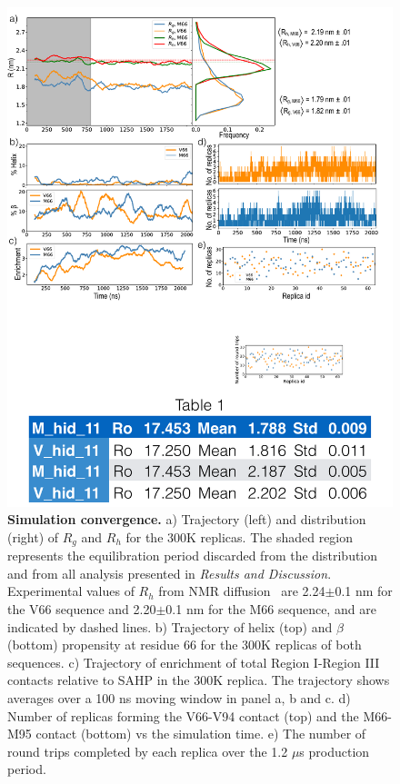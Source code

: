 \documentclass[10pt,letterpaper]{article}
\begin{document}
\begin{figure}[!ht]
\includegraphics[scale=0.5,width=\textwidth,trim={0 0cm 0 0cm},clip]{./figures/fig8.pdf}
\caption{{\bf Simulation convergence.} a) Trajectory (left) and distribution (right) of $R_{g}$ and $R_{h}$ for the 300K replicas. The shaded region represents the equilibration period discarded from the distribution and from all analysis presented in {\it Results and Discussion}. Experimental values of $R_{h}$ from NMR diffusion~\cite{Anastasia2013} are 2.24$\pm${0.1} nm for the V66 sequence and 2.20$\pm${0.1} nm for the M66 sequence, and are indicated by dashed lines. b) Trajectory of helix (top) and $\beta$ (bottom) propensity at residue 66 for the 300K replicas of both sequences. c) Trajectory of enrichment of total Region I-Region III contacts relative to SAHP in the 300K replica. The trajectory shows averages over a 100 ns moving window in panel a, b and c.  d) Number of replicas forming the V66-V94 contact (top) and the M66-M95 contact (bottom) vs the simulation time. e) The number of round trips completed by each replica over the 1.2 $\mu$s production period.}
\label{fig8} 
\end{figure}
 
\end{document}
